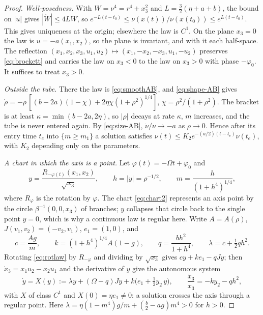 \documentclass[11pt,reqno]{amsart}
\theoremstyle{plain}
\theoremstyle{definition}
\theoremstyle{remark}
\begin{document}
\begin{proof}
\emph{Well-posedness.} With $W=\nu^{4}=r^{4}+x_3^{2}$ and $L=\frac32(\eta+a+b)$, the bound on $|u|$ gives
$|\dot W|\le4LW$, so $e^{-L(t-t_0)}\le\nu(x(t))/\nu(x(t_0))\le e^{L(t-t_0)}$. This gives uniqueness at the origin;
elsewhere the law is $C^{1}$. On the plane $x_3=0$ the law is $u=-a(x_1,x_2)$, so the plane is invariant, and
with it each half-space. The reflection $(x_1,x_2,x_3,u_1,u_2)\mapsto(x_1,-x_2,-x_3,u_1,-u_2)$ preserves
\eqref{eq:brockett} and carries the law on $x_3<0$ to the law on $x_3>0$ with phase $-\varphi_0$. It suffices
to treat $x_3>0$.

\emph{Outside the tube.} There the law is \eqref{eq:smoothAB}, and \eqref{eq:shape-AB} gives
$\dot\rho=-\rho\,[(b-2a)(1-\chi)+2\eta\chi(1+\rho^{2})^{1/4}]$, $\chi=\rho^{2}/(1+\rho^{2})$. The bracket is at least
$\kappa=\min(b-2a,2\eta)$, so $|\rho|$ decays at rate $\kappa$, $m$ increases, and the tube is never entered
again. By \eqref{eq:size-AB}, $\dot\nu/\nu\to-a$ as $\rho\to0$. Hence after its entry time $t_e$ into $\{m\ge m_1\}$
a solution satisfies $\nu(t)\le K_2e^{-(a/2)(t-t_e)}\nu(t_e)$, with $K_2$ depending only on the parameters.

\emph{A chart in which the axis is a point.} Let $\varphi(t)=-\Omega t+\varphi_0$ and
\[
  y=\frac{R_{-\varphi(t)}(x_1,x_2)}{\sqrt{x_3}},\qquad h=|y|=\rho^{-1/2},\qquad m=\frac{h}{(1+h^{4})^{1/4}},
\]
where $R_\varphi$ is the rotation by $\varphi$. The chart \eqref{eq:chart2} represents an axis point by the circle
$\beta^{-1}(0,0,x_3)$ of branches; $y$ collapses that circle back to the single point $y=0$, which is why a
continuous law is regular here. Write $A=A(\rho)$, $J(v_1,v_2)=(-v_2,v_1)$, $e_1=(1,0)$, and
\[
  c=\frac{Ag}{m},\qquad k=(1+h^{4})^{1/4}A(1-g),\qquad q=\frac{bh^{2}}{1+h^{4}},\qquad
  \lambda=c+\tfrac12qh^{2}.
\]
Rotating \eqref{eq:rotlaw} by $R_{-\varphi}$ and dividing by $\sqrt{x_3}$ gives $cy+ke_1-qJy$; then
$\dot x_3=x_1u_2-x_2u_1$ and the derivative of $y$ give the autonomous system
\begin{equation}\label{eq:ychart}
  \dot y=X(y):=\lambda y+(\Omega-q)Jy+k\bigl(e_1+\tfrac12y_2\,y\bigr),\qquad
  \frac{\dot x_3}{x_3}=-ky_2-qh^{2},
\end{equation}
with $X$ of class $C^{1}$ and $X(0)=\eta e_1\neq0$: a solution crosses the axis through a regular point.
Here $\lambda=\eta(1-m^{4})g/m+(\frac b2-ag)m^{4}>0$ for $h>0$.


\end{proof}
\end{document}
